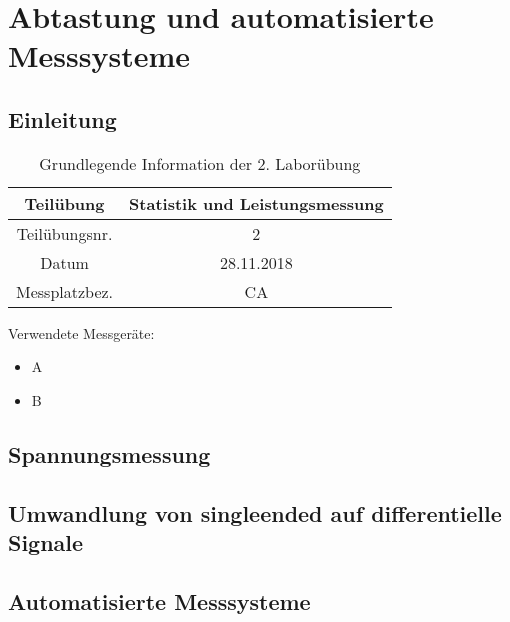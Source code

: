 \chapter{Abtastung und automatisierte Messsysteme}
\section{Einleitung}

\begin{table}[]
	\centering
	\begin{tabular}{|c|c|}
		\hline 
		Teilübung 	& Statistik und Leistungsmessung \\
		\hline 
		Teilübungsnr. 		& 2	 \\ 
		\hline 
		Datum 		& 28.11.2018 \\ 
		\hline 
		Messplatzbez. 	& CA \\
		\hline
	\end{tabular} 
	\caption{Grundlegende Information der 2. Laborübung}
\end{table}

Verwendete Messgeräte:
\begin{itemize}
	\item{A}
	\item{B}
\end{itemize}

\section{Spannungsmessung}

\section{Umwandlung von singleended auf differentielle Signale}

\section{Automatisierte Messsysteme}